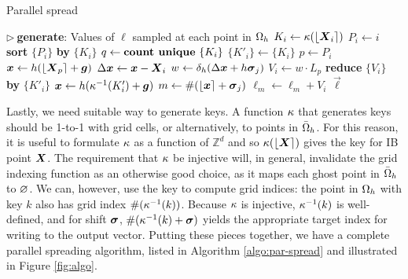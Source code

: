 \begin{algorithm}
\caption{Parallel spread}
\label{algo:par-spread}
\begin{algorithmic}[1]
\State $\triangleright\ $\textbf{generate}: Values of $\ell$ sampled at each point in $\Omega_h$
 \label{line:par-spread-ps} 
    \State $K_i \gets \kappa(\left\lfloor{\boldsymbol{X}_i}\right\rceil)$ 
    \State $P_i \gets i$ 
\EndFor
\State \textbf{sort} $\{P_i\}$ \textbf{by} $\{K_i\}$  \label{line:par-spread-sort}
\State $q \gets \text{\textbf{count unique} }\{K_i\}$ \label{line:par-spread-q}
 \label{line:par-spread-shifts} 
    \State $\{K'_i\} \gets \{K_i\}$
     \label{line:par-spread-v} 
        \State $p \gets P_i$
        \State $\boldsymbol{x} \gets h(\left\lfloor{\boldsymbol{X}_p}\right\rceil+\boldsymbol{g})$
        \State $\Delta\boldsymbol{x} \gets \boldsymbol{x}-\boldsymbol{X}_i$
        \State $w \gets \delta_h(\Delta\boldsymbol{x}+h\boldsymbol{\sigma}_j)$
        \State $V_i \gets w \cdot L_p$
    \EndFor \label{line:par-spread-vend}
    \textbf{reduce} $\{V_i\}$ \textbf{by} $\{K'_i\}$ \label{line:par-spread-reduce} 
     \label{line:par-spread-quse}
        \State $\boldsymbol{x} \gets h(\kappa^{-1}(K'_i) + \boldsymbol{g})$
        \State $m \gets \#(\left\lfloor{\boldsymbol{x}}\right\rceil + \boldsymbol{\sigma}_j)$ 
            \State $\ell_m \gets \ell_m + V_i$
        \EndIf
    \EndFor \label{line:par-spread-wend}
\EndFor
\State \Return $\vec{\ell}$
\EndProcedure
\end{algorithmic}
\end{algorithm}



Lastly, we need suitable way to generate keys. A function $\kappa$ that generates keys
should be 1-to-1 with grid cells, or alternatively, to points in $\bar{\Omega}_h$. For
this reason, it is useful to formulate $\kappa$ as a function of $\mathbb{Z}^d$ and so
$\kappa(\left\lfloor{\boldsymbol{X}}\right\rceil)$ gives the key for IB point $\boldsymbol{X}$. The requirement that $\kappa$ be
injective will, in general, invalidate the grid indexing function as an otherwise good
choice, as it maps each ghost point in $\bar{\Omega}_h$ to $\varnothing$. We can, however,
use the key to compute grid indices: the point in $\Omega_h$ with key $k$ also has grid
index $\#(\kappa^{-1}(k))$. Because $\kappa$ is injective, $\kappa^{-1}(k)$ is well-defined,
and for shift $\boldsymbol{\sigma}$, $\#(\kappa^{-1}(k)+\boldsymbol{\sigma})$ yields the appropriate target index for
writing to the output vector. Putting these pieces together, we have a complete parallel
spreading algorithm, listed in Algorithm \ref{algo:par-spread} and illustrated in Figure
\ref{fig:algo}.

